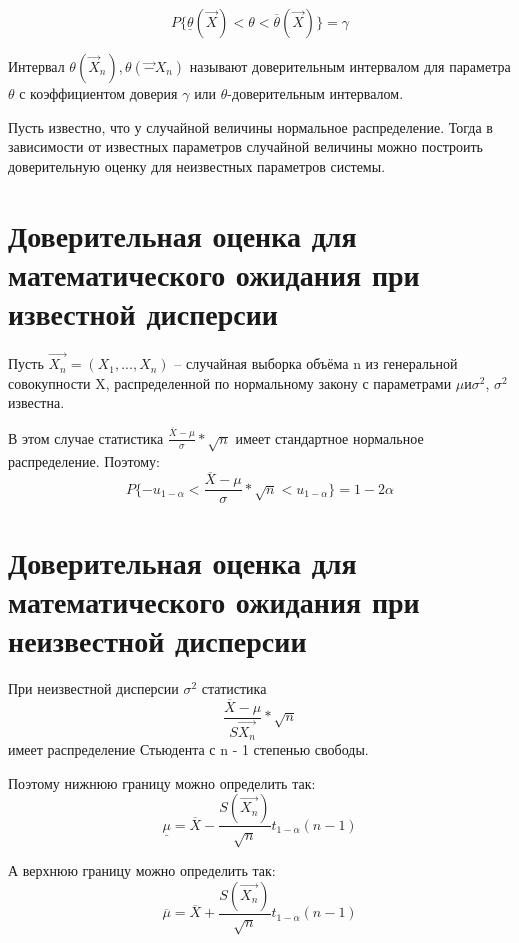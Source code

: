 \begin{equation}
P\{\underline{\theta}(\vec X)< \theta< \overline{\theta}(\vec X)\}=\gamma
\end{equation} 

Интервал $\theta(\vec X_n), \theta(\vec -X_n)$ называют доверительным интервалом для параметра $\theta$ с коэффициентом доверия $\gamma$ или $\theta$-доверительным интервалом.

Пусть известно, что у случайной величины нормальное распределение. 
Тогда в зависимости от известных параметров случайной величины можно построить доверительную оценку для неизвестных параметров системы.

\section*{Доверительная оценка для математического ожидания при известной дисперсии}
Пусть $\vec{X_n} = (X_1, ..., X_n)$ -- случайная выборка объёма n из генеральной совокупности X, распределенной по нормальному закону с параметрами $\mu и \sigma^2$, $\sigma^2$ известна.  

В этом случае статистика $\frac{\overline{X} - \mu}{\sigma}*\sqrt{n}$ имеет стандартное нормальное распределение.
Поэтому:
\begin{equation}
P\{-u_{1 - \alpha} < \frac{\overline{X} - \mu}{\sigma}*\sqrt{n} <  u_{1 - \alpha}\} = 1 - 2\alpha
\end{equation}

\section*{Доверительная оценка для математического ожидания при неизвестной дисперсии}
При неизвестной дисперсии $\sigma^2$ статистика
\begin{equation}
\frac{\overline{X} - \mu}{S{\vec{X_n}}}*\sqrt{n}
\end{equation}
имеет распределение Стьюдента с n - 1 степенью свободы.

Поэтому нижнюю границу можно определить так:
\begin{equation}
\underline{\mu} = \overline{X} - \frac{S(\vec{X_n})}{\sqrt{n}}t_{1 - \alpha}(n - 1)
\end{equation}

А верхнюю границу можно определить так:
\begin{equation}
\overline{\mu} = \overline{X} + \frac{S(\vec{X_n})}{\sqrt{n}}t_{1 - \alpha}(n - 1)
\end{equation}

